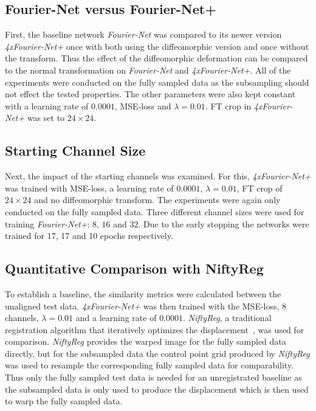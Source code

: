 \documentclass[english,version-2022-01]{uzl-thesis} %
\begin{document}
\subsection{Fourier-Net versus Fourier-Net+} \label{SubSec:Fourier-NetvsFourier-Net+}
First, the baseline network \emph{Fourier-Net} was compared to its newer version \emph{4xFourier-Net+} once with both using the diffeomorphic version and once without the transform. Thus the effect of the diffeomorphic deformation can be compared to the normal transformation on \emph{Fourier-Net} and \emph{4xFourier-Net+}. All of the experiments were conducted on the fully sampled data as the subsampling should not effect the tested properties. The other parameters were also kept constant with a learning rate of $0.0001$, MSE-loss and $\lambda = 0.01$. FT crop in \emph{4xFourier-Net+} was set to $24 \times 24$.


\subsection{Starting Channel Size} \label{SubSec:StartingChannels}
Next, the impact of the starting channels was examined. For this, \emph{4xFourier-Net+} was trained with MSE-loss, a learning rate of $0.0001$, $\lambda = 0.01$, FT crop of $24 \times 24$ and no diffeomorphic transform. The experiments were again only conducted on the fully sampled data. Three different channel sizes were used for training \emph{Fourier-Net+}: $8$, $16$ and $32$. Due to the early stopping the networks were trained for 17, 17 and 10 epochs respectively. 


\subsection{Quantitative Comparison with NiftyReg} \label{SubSec:QuantitativeComparisonNiftyReg}
To establish a baseline, the similarity metrics were calculated between the unaligned test data. \emph{4xFourier-Net+} was then trained with the MSE-loss, 8 channels, $\lambda = 0.01$ and a learning rate of $0.0001$. \emph{NiftyReg}, a traditional registration algorithm that iteratively optimizes the displacement~\cite{NiftiReg}, was used for comparison. \emph{NiftyReg} provides the warped image for the fully sampled data directly, but for the subsampled data the control point grid produced by \emph{NiftyReg} was used to resample the corresponding fully sampled data for comparability. Thus only the fully sampled test data is needed for an unregistrated baseline as the subsampled data is only used to produce the displacement which is then used to warp the fully sampled data. 
\end{document}
